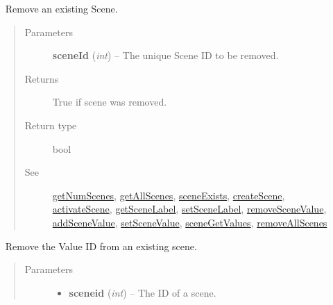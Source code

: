 \documentclass[letterpaper,10pt,english]{sphinxmanual}
\begin{document}
\begin{fulllineitems}
\begin{fulllineitems}
\begin{quote}
\begin{description}
\end{description}\end{quote}

\end{fulllineitems}


\begin{fulllineitems}
\label{libopenzwave:libopenzwave.PyManager.removeScene}~\label{libopenzwave:removescene}
Remove an existing Scene.
\begin{quote}\begin{description}
\item[{Parameters}] \leavevmode
\textbf{sceneId} (\emph{int}) -- The unique Scene ID to be removed.

\item[{Returns}] \leavevmode
True if scene was removed.

\item[{Return type}] \leavevmode
bool

\item[{See}] \leavevmode
{\hyperref[libopenzwave:getnumscenes]{getNumScenes}}, {\hyperref[libopenzwave:getallscenes]{getAllScenes}}, {\hyperref[libopenzwave:sceneexists]{sceneExists}}, {\hyperref[libopenzwave:createscene]{createScene}}, {\hyperref[libopenzwave:activatescene]{activateScene}}, {\hyperref[libopenzwave:getscenelabel]{getSceneLabel}}, {\hyperref[libopenzwave:setscenelabel]{setSceneLabel}}, {\hyperref[libopenzwave:removescenevalue]{removeSceneValue}}, {\hyperref[libopenzwave:addscenevalue]{addSceneValue}}, {\hyperref[libopenzwave:setscenevalue]{setSceneValue}}, {\hyperref[libopenzwave:scenegetvalues]{sceneGetValues}}, {\hyperref[libopenzwave:removeallscenes]{removeAllScenes}}

\end{description}\end{quote}

\end{fulllineitems}


\begin{fulllineitems}
\label{libopenzwave:libopenzwave.PyManager.removeSceneValue}~\label{libopenzwave:removescenevalue}
Remove the Value ID from an existing scene.
\begin{quote}\begin{description}
\item[{Parameters}] \leavevmode\begin{itemize}
\item {} 
\textbf{sceneid} (\emph{int}) -- The ID of a scene.


\end{itemize}
\end{description}
\end{quote}
\end{fulllineitems}
\end{fulllineitems}
\end{document}
